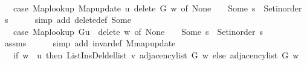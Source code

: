 \begin{isabellebody}
\ \isamarkupfalse%
\ {\isachardoublequoteopen}{\isachardot}{\kern0pt}{\isachardot}{\kern0pt}{\isachardot}{\kern0pt}\ {\isacharequal}{\kern0pt}\ {\isacharparenleft}{\kern0pt}case\ Map{\isacharunderscore}{\kern0pt}lookup\ {\isacharparenleft}{\kern0pt}Map{\isacharunderscore}{\kern0pt}update\ {\isacharquery}{\kern0pt}u\ {\isacharquery}{\kern0pt}delete\ G{\isacharparenright}{\kern0pt}\ w\ of\ None\ {\isasymRightarrow}\ {\isacharbrackleft}{\kern0pt}{\isacharbrackright}{\kern0pt}\ {\isacharbar}{\kern0pt}\ Some\ s\ {\isasymRightarrow}\ Set{\isacharunderscore}{\kern0pt}inorder\ s{\isacharparenright}{\kern0pt}{\isachardoublequoteclose}\isanewline
\ \ \ \ \isamarkupfalse%
\ {\isacharparenleft}{\kern0pt}simp\ add{\isacharcolon}{\kern0pt}\ delete{\isacharunderscore}{\kern0pt}def\ Some{\isacharparenright}{\kern0pt}\isanewline
\ \ \isamarkupfalse%
\ \isamarkupfalse%
\ {\isachardoublequoteopen}{\isachardot}{\kern0pt}{\isachardot}{\kern0pt}{\isachardot}{\kern0pt}\ {\isacharequal}{\kern0pt}\ {\isacharparenleft}{\kern0pt}case\ {\isacharparenleft}{\kern0pt}Map{\isacharunderscore}{\kern0pt}lookup\ G{\isacharparenleft}{\kern0pt}{\isacharquery}{\kern0pt}u\ {\isasymmapsto}\ {\isacharquery}{\kern0pt}delete{\isacharparenright}{\kern0pt}{\isacharparenright}{\kern0pt}\ w\ of\ None\ {\isasymRightarrow}\ {\isacharbrackleft}{\kern0pt}{\isacharbrackright}{\kern0pt}\ {\isacharbar}{\kern0pt}\ Some\ s\ {\isasymRightarrow}\ Set{\isacharunderscore}{\kern0pt}inorder\ s{\isacharparenright}{\kern0pt}{\isachardoublequoteclose}\isanewline
\ \ \ \ \isamarkupfalse%
\ assms\isanewline
\ \ \ \ \isamarkupfalse%
\ {\isacharparenleft}{\kern0pt}simp\ add{\isacharcolon}{\kern0pt}\ invar{\isacharunderscore}{\kern0pt}def\ M{\isachardot}{\kern0pt}map{\isacharunderscore}{\kern0pt}update{\isacharparenright}{\kern0pt}\isanewline
\ \ \isamarkupfalse%
\ \isamarkupfalse%
\ {\isachardoublequoteopen}{\isachardot}{\kern0pt}{\isachardot}{\kern0pt}{\isachardot}{\kern0pt}\ {\isacharequal}{\kern0pt}\ {\isacharparenleft}{\kern0pt}if\ w\ {\isacharequal}{\kern0pt}\ {\isacharquery}{\kern0pt}u\ then\ List{\isacharunderscore}{\kern0pt}Ins{\isacharunderscore}{\kern0pt}Del{\isachardot}{\kern0pt}del{\isacharunderscore}{\kern0pt}list\ {\isacharquery}{\kern0pt}v\ {\isacharparenleft}{\kern0pt}adjacency{\isacharunderscore}{\kern0pt}list\ G\ w{\isacharparenright}{\kern0pt}\ else\ adjacency{\isacharunderscore}{\kern0pt}list\ G\ w{\isacharparenright}{\kern0pt}{\isachardoublequoteclose}\isanewline
\ \ \isamarkupfalse%

\end{isabellebody}
